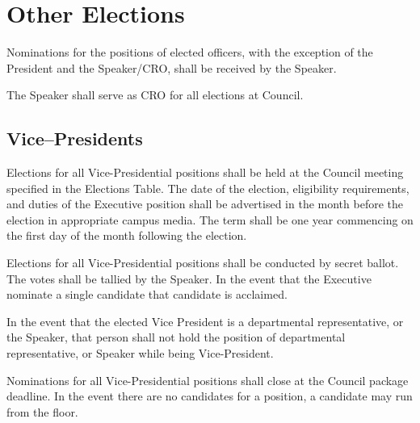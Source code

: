 \newpage

\section{Other Elections}
\begin{longenum}[ label*=\thesubsection.\arabic*., align=left]


 \item Nominations for the positions of elected officers, with the exception of the President and the Speaker/CRO, shall be received by the Speaker. 
 
 \item The Speaker shall serve as CRO for all elections at Council.
\end{longenum}

\subsection{Vice--Presidents}
\begin{longenum}[ label*=\thesubsection.\arabic*., align=left]
	\item Elections for all Vice-Presidential positions shall be held at the Council meeting specified in the Elections Table. The date of the election, eligibility requirements, and duties of the Executive position shall be advertised in the month before the election in appropriate campus media. The term shall be one year commencing on the first day of the month following the election. 
	\item Elections for all Vice-Presidential positions shall be conducted by secret ballot. The votes shall be tallied by the Speaker. In the event that the Executive nominate a single candidate that candidate is acclaimed.
	\item In the event that the elected Vice President is a departmental representative, or the Speaker, that person shall not hold the position of departmental representative, or Speaker while being Vice-President. 
	\item Nominations for all Vice-Presidential positions shall close at the Council package deadline. In the event there are no candidates for a position, a candidate may run from the floor.
\end{longenum}

